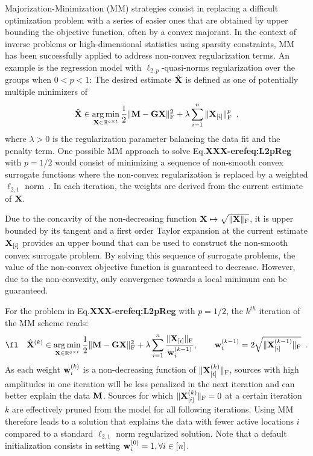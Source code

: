 Majorization-Minimization (MM) strategies consist in replacing a difficult
optimization problem with a series of easier ones that are obtained by
upper bounding the objective function, often by a convex majorant.
%
In the context of inverse problems or high-dimensional statistics using sparsity constraints,
MM has been successfully applied to address non-convex regularization terms.
An example is the regression model with $\ell_{2,p}$-quasi-norms regularization
over the groups when $0<p<1$: The desired estimate $\hat{\mathbf{X}}$ is defined as one of potentially multiple minimizers of
\begin{equation} \label{eq:L2pReg}
\hat{\mathbf{X}} \in \mathop{\mathrm{arg}\,\mathrm{min}}_{\mathbf{X}\in\mathbb{R}^{q \times t}} \frac{1}{2} \|{\mathbf{M} - \mathbf{G} \mathbf{X}}\|_{\rm F}^2  + \lambda \sum_{i=1}^n \|{\mathbf{X}_{[i]}}\|_{\rm F}^p \enspace,
\end{equation}
where $\lambda > 0$ is the regularization parameter balancing the data fit and the penalty term. One possible MM approach to solve Eq.\textbf{XXX-eref{eq:L2pReg}} %
with $p=1/2$ would consist of minimizing a sequence of non-smooth convex surrogate functions where the non-convex regularization is replaced by a weighted $\ell_{2,1}$ norm~\cite{strohmeier-etal:16}. In each iteration, the weights are derived from the current estimate of $\mathbf{X}$.

Due to the concavity of the non-decreasing function $\mathbf{X}\mapsto\sqrt{\|{\mathbf{X}}\|_{\rm F}}$, it is upper bounded by its tangent and a first order Taylor expansion at the current estimate $\mathbf{X}_{[i]}$ provides an upper bound that can be used to construct the non-smooth convex surrogate problem. By solving this sequence of surrogate problems, the value of the non-convex objective function is guaranteed to decrease. However, due to the non-convexity, only convergence towards a local minimum can be guaranteed.


For the problem in Eq.\textbf{XXX-eref{eq:L2pReg}} %
 with $p=1/2$, the $k^{th}$ iteration of the MM scheme reads:
\begin{eqnarray}
\label{eq:MM}
\fl \quad \hat{\bfX}^{(k)} \in \argmin_{\bfX\in\R^{q \times t}} \frac{1}{2} \fronormsq{\bfM - \bfG \bfX}  + \lambda \sum_{i=1}^n \frac{ \fronorm{\bfX_{[i]}} }{ \bfw^{(k-1)}_{i}}, \qquad \bfw^{(k-1)}_{i} = 2 \sqrt{\fronorm{\bfX^{(k-1)}_{[i]}}} \enspace.
\end{eqnarray}
As each weight $\mathbf{w}^{(k)}_{i}$ is a non-decreasing function of $\|{\mathbf{X}^{(k)}_{[i]}}\|_{\rm F}$, sources with high amplitudes in one iteration will be less penalized in the next iteration and can better explain the data $\mathbf{M}$. Sources for which $\|{\mathbf{X}^{(k)}_{[i]}}\|_{\rm F} = 0$ at a certain iteration $k$ are effectively pruned from the model for all following iterations. Using MM therefore leads to a solution that explains the data with fewer active  locations $i$ compared to a standard $\ell_{2,1}$ norm regularized solution.
Note that a default initialization consists in setting $\mathbf{w}^{(0)}_{i}=1, \forall i \in [n]$.

